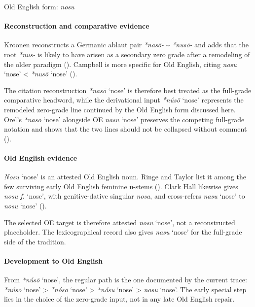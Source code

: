 \documentclass[
  british,
  a4paper,
]{article}
\providecommand{\Recon}[1]{\emph{*#1}}
\begin{document}
Old English form: \emph{nosu}

\paragraph{Reconstruction and comparative
evidence}\label{reconstruction-and-comparative-evidence-108}

Kroonen reconstructs a Germanic ablaut pair \emph{*nasō-}
\textasciitilde{} \emph{*nusō-} and adds that the root \emph{*nus-} is
likely to have arisen as a secondary zero grade after a remodeling of
the older paradigm ().
Campbell is more specific for Old English, citing \emph{nosu} `nose'
\textless{} \Recon{nusō} `nose' ().

The citation reconstruction \Recon{nasō} `nose' is therefore best
treated as the full-grade comparative headword, while the derivational
input \Recon{núsō} `nose' represents the remodeled zero-grade line
continued by the Old English form discussed here. Orel's \Recon{nasō}
`nose' alongside OE \emph{nasu} `nose' preserves the competing
full-grade notation and shows that the two lines should not be collapsed
without comment ().

\paragraph{Old English evidence}\label{old-english-evidence-110}

\emph{Nosu} `nose' is an attested Old English noun. Ringe and Taylor
list it among the few surviving early Old English feminine u-stems
(). Clark Hall
likewise gives \emph{nosu f.} `nose', with genitive-dative singular
\emph{nosa}, and cross-refers {\emph{nasu}} `nose' to \emph{nosu} `nose'
().

The selected OE target is therefore attested \emph{nosu} `nose', not a
reconstructed placeholder. The lexicographical record also gives
{\emph{nasu}} `nose' for the full-grade side of the tradition.

\paragraph{Development to Old
English}\label{development-to-old-english-108}

From \Recon{núsō} `nose', the regular path is the one documented by the
current trace: \Recon{núsō} `nose' \textgreater{} \Recon{nósō} `nose'
\textgreater{} \Recon{nósu} `nose' \textgreater{} \emph{nosu} `nose'.
The early special step lies in the choice of the zero-grade input, not
in any late Old English repair.
\end{document}
